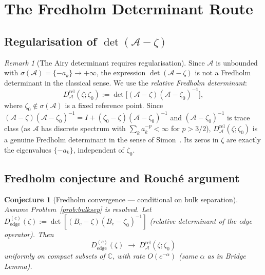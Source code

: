 \documentclass[12pt,a4paper]{amsart}
\newtheorem{conjecture}[theorem]{Conjecture}
\theoremstyle{definition}
\theoremstyle{remark}
\newtheorem{remark}[theorem]{Remark}
\newcommand{\cA}{\mathcal{A}}
\newcommand{\C}{\mathbb{C}}
\begin{document}
\section{The Fredholm Determinant Route}
\label{sec:fredholm}

\subsection{Regularisation of $\det(\cA - \zeta)$}

\begin{remark}[The Airy determinant requires regularisation]
\label{rem:detreg}
Since $\cA$ is unbounded with $\sigma(\cA) = \{-a_k\} \to +\infty$,
the expression $\det(\cA-\zeta)$ is not a Fredholm determinant
in the classical sense.
We use the \emph{relative Fredholm determinant}:
\begin{equation}\label{eq:reldet}
 D_\cA^{\mathrm{rel}}(\zeta;\zeta_0)
 := \det\bigl[(\cA-\zeta)(\cA-\zeta_0)^{-1}\bigr],
\end{equation}
where $\zeta_0 \notin \sigma(\cA)$ is a fixed reference point.
Since $(\cA-\zeta)(\cA-\zeta_0)^{-1} = I + (\zeta_0-\zeta)(\cA-\zeta_0)^{-1}$
and $(\cA-\zeta_0)^{-1}$ is trace class
(as $\cA$ has discrete spectrum with $\sum_k a_k^{-p} < \infty$ for $p>3/2$),
$D_\cA^{\mathrm{rel}}(\zeta;\zeta_0)$ is a genuine Fredholm determinant
in the sense of Simon~\cite{Simon2005}.
Its zeros in $\zeta$ are exactly the eigenvalues $\{-a_k\}$,
independent of $\zeta_0$.
\end{remark}

\subsection{Fredholm conjecture and Rouch\'{e} argument}

\begin{conjecture}[Fredholm convergence --- conditional on bulk separation]
\label{conj:fredholm}
Assume Problem~\ref{prob:bulksep} is resolved.
Let $D_{\mathrm{edge}}^{(c)}(\zeta)
:= \det[(B_c - \zeta)(B_c - \zeta_0)^{-1}]$
(relative determinant of the edge operator).
Then
\begin{equation}\label{eq:fredconv}
 D_{\mathrm{edge}}^{(c)}(\zeta)
 \;\longrightarrow\;
 D_\cA^{\mathrm{rel}}(\zeta;\zeta_0)
\end{equation}
uniformly on compact subsets of $\C$,
with rate $O(c^{-\alpha})$ (same $\alpha$ as in Bridge Lemma).
\end{conjecture}
\end{document}
